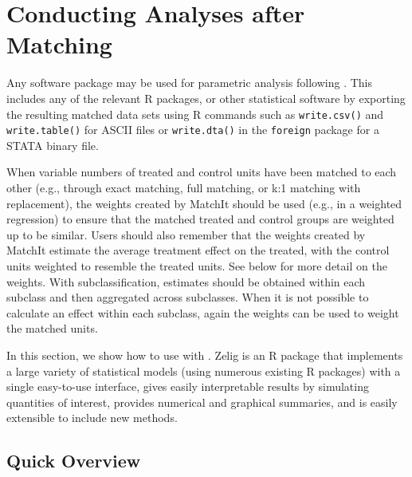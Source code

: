 \section{Conducting Analyses after Matching}
\label{sec:analysis}

Any software package may be used for parametric analysis following
\MatchIt.  This includes any of the relevant R packages, or other
statistical software by exporting the resulting matched data sets
using R commands such as {\tt write.csv()} and {\tt write.table()} for
ASCII files or {\tt write.dta()} in the {\tt foreign} package for a
STATA binary file.

When variable numbers of treated and control units have been matched
to each other (e.g., through exact matching, full matching, or k:1
matching with replacement), the weights created by MatchIt should be
used (e.g., in a weighted regression) to ensure that the matched
treated and control groups are weighted up to be similar.  Users
should also remember that the weights created by MatchIt estimate the
average treatment effect on the treated, with the control units
weighted to resemble the treated units.  See below for more detail on
the weights.  With subclassification, estimates should be obtained
within each subclass and then aggregated across subclasses.  When it
is not possible to calculate an effect within each subclass, again the
weights can be used to weight the matched units.

In this section, we show how to use
 with \MatchIt.  Zelig
\citep{ImaKinLau06} is an R package that implements a large variety of
statistical models (using numerous existing R packages) with a single
easy-to-use interface, gives easily interpretable results by
simulating quantities of interest, provides numerical and graphical
summaries, and is easily extensible to include new methods.

\subsection{Quick Overview}


